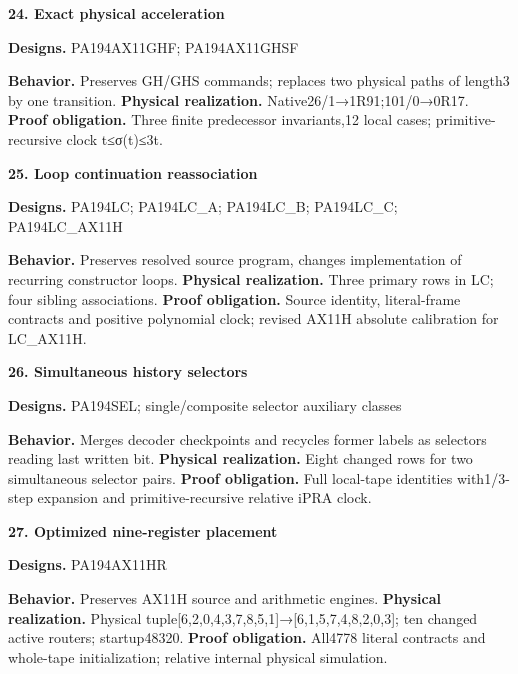 \documentclass[10pt,a4paper]{article}
\begin{document}
\par\medskip\begin{samepage}\noindent\textbf{24. Exact physical acceleration}\par\nobreak
\textbf{Designs.} PA194\allowbreak{}AX11\allowbreak{}GHF;\allowbreak{} PA194\allowbreak{}AX11\allowbreak{}GHSF

\textbf{Behavior.} Preserves GH/GHS commands; replaces two physical paths of length3 by one transition. \textbf{Physical realization.} Native26/1→1R91;101/0→0R17. \textbf{Proof obligation.} Three finite predecessor invariants,\allowbreak{}12 local cases; primitive-recursive clock t≤σ(t)≤3t.
\end{samepage}

\par\medskip\begin{samepage}\noindent\textbf{25. Loop continuation reassociation}\par\nobreak
\textbf{Designs.} PA194\allowbreak{}LC;\allowbreak{} PA194\allowbreak{}LC\_A;\allowbreak{} PA194\allowbreak{}LC\_B;\allowbreak{} PA194\allowbreak{}LC\_C;\allowbreak{} PA194\allowbreak{}LC\_AX11\allowbreak{}H

\textbf{Behavior.} Preserves resolved source program, changes implementation of recurring constructor loops. \textbf{Physical realization.} Three primary rows in LC; four sibling associations. \textbf{Proof obligation.} Source identity, literal-frame contracts and positive polynomial clock; revised AX11H absolute calibration for LC\_AX11H.
\end{samepage}

\par\medskip\begin{samepage}\noindent\textbf{26. Simultaneous history selectors}\par\nobreak
\textbf{Designs.} PA194\allowbreak{}SEL;\allowbreak{} single/composite selector auxiliary classes

\textbf{Behavior.} Merges decoder checkpoints and recycles former labels as selectors reading last written bit. \textbf{Physical realization.} Eight changed rows for two simultaneous selector pairs. \textbf{Proof obligation.} Full local-tape identities with1/3-step expansion and primitive-recursive relative iPRA clock.
\end{samepage}

\par\medskip\begin{samepage}\noindent\textbf{27. Optimized nine-register placement}\par\nobreak
\textbf{Designs.} PA194\allowbreak{}AX11\allowbreak{}HR

\textbf{Behavior.} Preserves AX11H source and arithmetic engines. \textbf{Physical realization.} Physical tuple[6,\allowbreak{}2,\allowbreak{}0,\allowbreak{}4,\allowbreak{}3,\allowbreak{}7,\allowbreak{}8,\allowbreak{}5,\allowbreak{}1]→[6,\allowbreak{}1,\allowbreak{}5,\allowbreak{}7,\allowbreak{}4,\allowbreak{}8,\allowbreak{}2,\allowbreak{}0,\allowbreak{}3]; ten changed active routers; startup48320. \textbf{Proof obligation.} All4778 literal contracts and whole-tape initialization; relative internal physical simulation.
\end{samepage}
\end{document}
